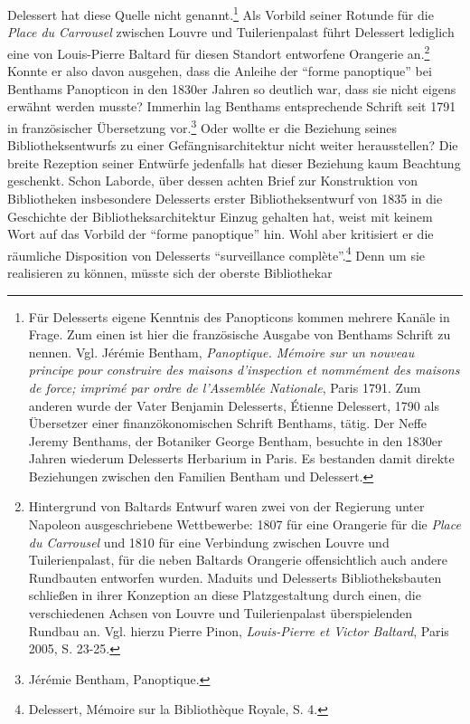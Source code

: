 Delessert hat diese Quelle nicht genannt.\footnote{Für Delesserts eigene
  Kenntnis des Panopticons kommen mehrere Kanäle in Frage. Zum einen ist
  hier die französische Ausgabe von Benthams Schrift zu nennen. Vgl.
  Jérémie Bentham, \emph{Panoptique. Mémoire sur un nouveau principe
  pour construire des maisons d'inspection et nommément des maisons de
  force; imprimé par ordre de l'Assemblée Nationale}, Paris 1791. Zum
  anderen wurde der Vater Benjamin Delesserts, Étienne Delessert, 1790
  als Übersetzer einer finanzökonomischen Schrift Benthams, tätig. Der
  Neffe Jeremy Benthams, der Botaniker George Bentham, besuchte in den
  1830er Jahren wiederum Delesserts Herbarium in Paris. Es bestanden
  damit direkte Beziehungen zwischen den Familien Bentham und Delessert.}
Als Vorbild seiner Rotunde für die \emph{Place du Carrousel} zwischen
Louvre und Tuilerienpalast führt Delessert lediglich eine von
Louis-Pierre Baltard für diesen Standort entworfene Orangerie
an.\footnote{Hintergrund von Baltards Entwurf waren zwei von der
  Regierung unter Napoleon ausgeschriebene Wettbewerbe: 1807 für eine
  Orangerie für die \emph{Place du Carrousel} und 1810 für eine
  Verbindung zwischen Louvre und Tuilerienpalast, für die neben Baltards
  Orangerie offensichtlich auch andere Rundbauten entworfen wurden.
  Maduits und Delesserts Bibliotheksbauten schließen in ihrer Konzeption
  an diese Platzgestaltung durch einen, die verschiedenen Achsen von
  Louvre und Tuilerienpalast überspielenden Rundbau an. Vgl. hierzu
  Pierre Pinon, \emph{Louis-Pierre et Victor Baltard}, Paris 2005, S.
  23-25.} Konnte er also davon ausgehen, dass die Anleihe der
\enquote{forme panoptique} bei Benthams Panopticon in den 1830er Jahren
so deutlich war, dass sie nicht eigens erwähnt werden musste? Immerhin
lag Benthams entsprechende Schrift seit 1791 in französischer
Übersetzung vor.\footnote{Jérémie Bentham, Panoptique.} Oder wollte er
die Beziehung seines Bibliotheksentwurfs zu einer Gefängnisarchitektur
nicht weiter herausstellen? Die breite Rezeption seiner Entwürfe
jedenfalls hat dieser Beziehung kaum Beachtung geschenkt. Schon Laborde,
über dessen achten Brief zur Konstruktion von Bibliotheken insbesondere
Delesserts erster Bibliotheksentwurf von 1835 in die Geschichte der
Bibliotheksarchitektur Einzug gehalten hat, weist mit keinem Wort auf
das Vorbild der \enquote{forme panoptique} hin. Wohl aber kritisiert er
die räumliche Disposition von Delesserts \enquote{surveillance
complète}.\footnote{Delessert, Mémoire sur la Bibliothèque Royale, S. 4.}
Denn um sie realisieren zu können, müsste sich der oberste Bibliothekar
